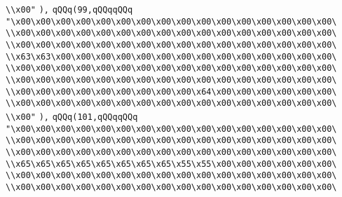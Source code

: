 \verb|\\x00"|\newline
\verb|),|\newline
\verb|qQQq(99,qQQqqQQq|\newline
\verb|"\x00\x00\x00\x00\x00\x00\x00\x00\x00\x00\x00\x00\x00\x00\x00\x00\|\newline
\verb|\\x00\x00\x00\x00\x00\x00\x00\x00\x00\x00\x00\x00\x00\x00\x00\x00\|\newline
\verb|\\x00\x00\x00\x00\x00\x00\x00\x00\x00\x00\x00\x00\x00\x00\x00\x00\|\newline
\verb|\\x63\x63\x00\x00\x00\x00\x00\x00\x00\x00\x00\x00\x00\x00\x00\x00\|\newline
\verb|\\x00\x00\x00\x00\x00\x00\x00\x00\x00\x00\x00\x00\x00\x00\x00\x00\|\newline
\verb|\\x00\x00\x00\x00\x00\x00\x00\x00\x00\x00\x00\x00\x00\x00\x00\x00\|\newline
\verb|\\x00\x00\x00\x00\x00\x00\x00\x00\x00\x64\x00\x00\x00\x00\x00\x00\|\newline
\verb|\\x00\x00\x00\x00\x00\x00\x00\x00\x00\x00\x00\x00\x00\x00\x00\x00\|\newline
\verb|\\x00"|\newline
\verb|),|\newline
\verb|qQQq(101,qQQqqQQq|\newline
\verb|"\x00\x00\x00\x00\x00\x00\x00\x00\x00\x00\x00\x00\x00\x00\x00\x00\|\newline
\verb|\\x00\x00\x00\x00\x00\x00\x00\x00\x00\x00\x00\x00\x00\x00\x00\x00\|\newline
\verb|\\x00\x00\x00\x00\x00\x00\x00\x00\x00\x00\x00\x00\x00\x00\x00\x00\|\newline
\verb|\\x65\x65\x65\x65\x65\x65\x65\x65\x55\x55\x00\x00\x00\x00\x00\x00\|\newline
\verb|\\x00\x00\x00\x00\x00\x00\x00\x00\x00\x00\x00\x00\x00\x00\x00\x00\|\newline
\verb|\\x00\x00\x00\x00\x00\x00\x00\x00\x00\x00\x00\x00\x00\x00\x00\x00\|\newline
